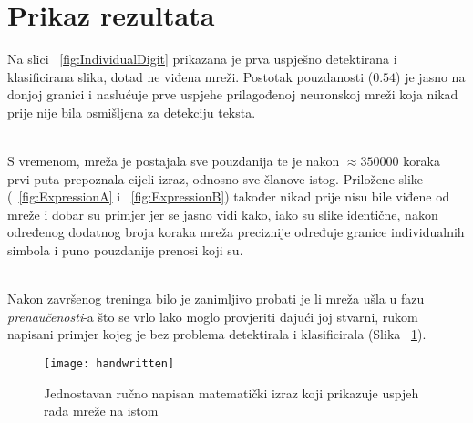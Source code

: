 \section{Prikaz rezultata}
Na slici ~\ref{fig:IndividualDigit} prikazana je prva uspješno detektirana i klasificirana slika, dotad ne viđena mreži.
Postotak pouzdanosti ($0.54$) je jasno na donjoj granici i naslućuje prve uspjehe prilagođenoj neuronskoj mreži koja nikad prije nije bila osmišljena za detekciju teksta.
\begin{figure}
	\qquad
\end{figure} \\
S vremenom, mreža je postajala sve pouzdanija te je nakon $\approx 350000$ koraka prvi puta prepoznala cijeli izraz, odnosno sve članove istog.
Priložene slike (~\ref{fig:ExpressionA} i ~\ref{fig:ExpressionB}) također nikad prije nisu bile viđene od mreže i dobar su primjer jer se jasno vidi kako, iako su slike identične, nakon određenog dodatnog broja koraka mreža preciznije određuje granice individualnih simbola i puno pouzdanije prenosi koji su. \\
\begin{figure}
	\qquad
\end{figure} \\
Nakon završenog treninga bilo je zanimljivo probati je li mreža ušla u fazu \emph{prenaučenosti}-a što se vrlo lako moglo provjeriti dajući joj stvarni, rukom napisani primjer kojeg je bez problema detektirala i klasificirala (Slika ~\ref{fig:Handwritten}).
\begin{figure}[h!]
	\texttt{[image: handwritten]}
	\caption{Jednostavan ručno napisan matematički izraz koji prikazuje uspjeh rada mreže na istom}
	\label{fig:Handwritten}
\end{figure}
